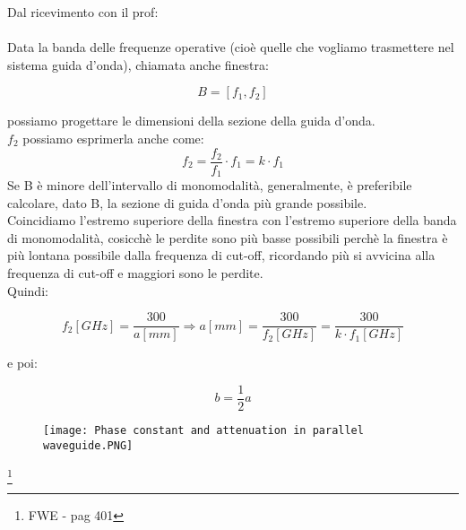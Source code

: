 \begin{tcolorbox}
    Dal ricevimento con il prof: \\ \\ 

    Data la banda delle frequenze operative (cioè quelle che vogliamo trasmettere nel sistema guida d'onda), 
chiamata anche finestra: 

{
    \Large
    \begin{equation}
        B = [f_1, f_2]
    \end{equation}
} 

possiamo progettare le dimensioni della sezione della guida d'onda. \\ 

$f_2$ possiamo esprimerla anche come: 
{
    \Large
    \begin{equation}
        f_2 = \frac{f_2}{f_1} \cdot f_1 = k \cdot f_1
    \end{equation}
}
Se B è minore dell'intervallo di monomodalità, generalmente, 
è preferibile calcolare, dato B, la sezione di guida d'onda più grande possibile. \\

Coincidiamo l'estremo superiore della finestra con l'estremo superiore della banda di monomodalità, 
cosicchè le perdite sono più basse possibili perchè la finestra è più lontana 
possibile dalla frequenza di cut-off, ricordando più si avvicina alla frequenza di cut-off e maggiori sono le perdite. \\ 

Quindi: 

{
    \Large
    \begin{equation}
        f_2 [GHz] = \frac{300}{a [mm]} 
        \Rightarrow 
        a [mm] = \frac{300}{f_2 [GHz]} 
        = \frac{300}{k \cdot f_1 [GHz]}
    \end{equation}
}

e poi: 

{
    \Large 
    \begin{equation}
        b = \frac{1}{2} a 
    \end{equation}
}


\end{tcolorbox}

\begin{figure}[h]
    \centering
    \texttt{[image: Phase constant and attenuation in parallel waveguide.PNG]}
\end{figure}  

\footnote{FWE - pag 401}

